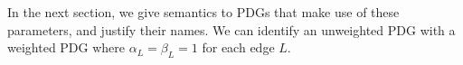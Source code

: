 \documentclass{article}
\newcommand{\sfM}{\mathsf M}
\numberwithin{equation}{section}
\begin{document}
In the next section, we give semantics to PDGs that make use of
these parameters, and justify their names. 
We can identify an unweighted PDG with a weighted PDG where $\alpha_L
= \beta_L = 1$ for each edge $L$.



\end{document}

